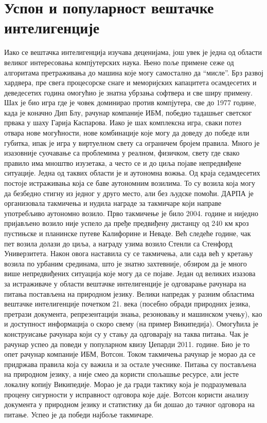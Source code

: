 \section*{Успон и популарност вештачке интелигенције}
Иако се вештачка интелигенција изучава деценијама, још увек је једна од области великог интересовања компјутерских наука. Њено поље примене сеже од алгоритама претраживања до машина које могу самостално да “мисле”. Брз развој хардвера, пре свега процесорске снаге и меморијских капацитета осамдесетих и деведесетих година омогућио је знатна убрзања софтвера и све ширу примену. Шах је био игра где је човек доминирао против компјутера, све до 1977 године, када је коначно Дип Блу, рачунар компаније ИБМ, победио тадашњег светског првака у шаху Гарија Каспарова.   
Иако је шах комплексна игра, сваки потез отвара нове могућности, нове комбинације које могу да доведу до победе или губитка, ипак је игра у виртуелном свету са ограничем бројем правила. Много је изазовније суочавање са проблемима у реалном, физичком, свету где свако правило има мноштво изузетака, а често се и до циља појаве непредвиђене ситуације. Једна од таквих области је и аутономна вожња. Од краја седамдесетих постоје истраживања која се баве аутономним возилима. То су возила која могу да безбедно стигну из једног у друго место, али без људске помоћи. ДАРПА је организовала такмичења и нудила награде за такмичаре који направе употребљиво аутономно возило. Прво такмичење је било 2004. године и ниједно пријављено возило није успело да пређе предвиђену дистанцу од 240 км кроз пустињске и планинске путеве Калифорине и Неваде. Већ следеће године, чак пет возила долази до циља, а награду узима возило Стенли са Стенфорд Универзитета. Након овога наставила су се такмичења, али сада већ у кретању возила по урбаним срединама, што је знатно захтевније, обзиром да је много више непредвиђених ситуација које могу да се појаве. 
Један од великих изазова за истраживаче у области вештачке интелигенције је одговарање рачунара на питања постављена на природном језику. Велики напредак у разним областима вештачке интелигенције почетком 21. века (посебно обради природних језика, претрази документа, репрезентацији знања, резоновању и машинском учењу), као и доступност информација о скоро свему (на пример Википедија). Омогућила је конструисање рачунара који су у стању да одговарају на таква питања. Чак је рачунар успео да поведи у популарном квизу Џепарди 2011. године. Био је то опет рачунар компаније ИБМ, Вотсон. Током такмичења рачунар је морао да се придржава правила која су важила и за остале учеснике. Питања су постављена на природном језику, а није смео да користи спољашње ресурсе, али јесте локалну копију Википедије. Морао је да гради тактику која је подразумевала процену сигурности у исправност одговора које даје. Вотсон користи анализу документа у природном језику и статистику да би дошао до тачног одговора на питање. Успео је да победи најбоље такмичаре. 
